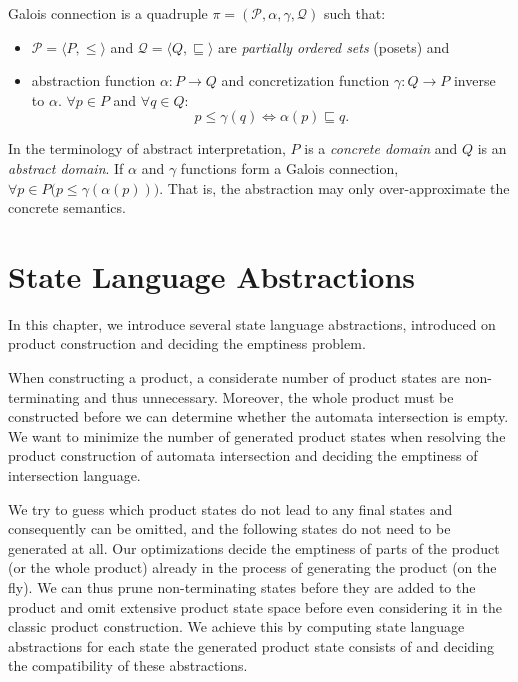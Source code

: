 \begin{definition} \hfill \newline
Galois connection is a quadruple $\pi = (\mathcal{P}, \alpha, \gamma, \mathcal{Q})$ such that:

\begin{itemize}
    \item $\mathcal{P} = \langle P, \leq \rangle$ and $\mathcal{Q} = \langle Q, \sqsubseteq \rangle$ are \emph{partially ordered sets} (posets) and
    \item abstraction function $\alpha : P \rightarrow Q$ and concretization function $\gamma : Q \rightarrow P$ inverse to $\alpha$. $\forall p \in P$ and $\forall q \in Q$:
    \[
        p \leq \gamma(q) \Leftrightarrow \alpha(p) \sqsubseteq q \text{.}
    \]
\end{itemize}

\end{definition}

In the terminology of abstract interpretation, $P$ is a \emph{concrete domain} and $Q$ is an \emph{abstract domain}. If $\alpha$ and $\gamma$ functions form a Galois connection, $\forall p \in P \bigr( p \leq \gamma(\alpha(p)) \bigr)$. That is, the abstraction may only over-approximate the concrete semantics.


\chapter{State Language Abstractions}

In this chapter, we introduce several state language abstractions, introduced on product construction and deciding the emptiness problem.

When constructing a product, a considerate number of product states are non-terminating and thus unnecessary. Moreover, the whole product must be constructed before we can determine whether the automata intersection is empty. We want to minimize the number of generated product states when resolving the product construction of automata intersection and deciding the emptiness of intersection language.

We try to guess which product states do not lead to any final states and consequently can be omitted, and the following states do not need to be generated at all. Our optimizations decide the emptiness of parts of the product (or the whole product) already in the process of generating the product (on the fly). We can thus prune non-terminating states before they are added to the product and omit extensive product state space before even considering it in the classic product construction. We achieve this by computing state language abstractions for each state the generated product state consists of and deciding the compatibility of these abstractions.


